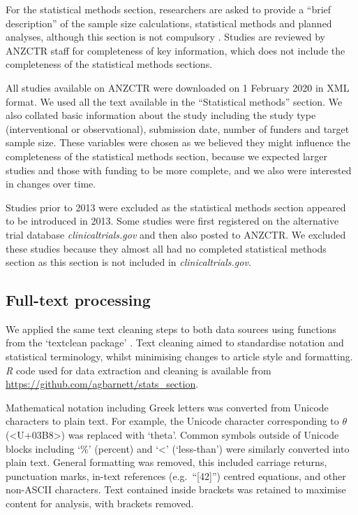 \documentclass[12pt]{article}
\begin{document}
For the statistical methods section, researchers are asked to provide a
``brief description'' of the sample size calculations, statistical
methods and planned analyses, although this section is not compulsory
\citep{ANZCTR}. Studies are reviewed by ANZCTR staff for completeness of
key information, which does not include the completeness of the
statistical methods sections.

All studies available on ANZCTR were downloaded on 1 February 2020 in
XML format. We used all the text available in the ``Statistical
methods'' section. We also collated basic information about the study
including the study type (interventional or observational), submission
date, number of funders and target sample size. These variables were
chosen as we believed they might influence the completeness of the
statistical methods section, because we expected larger studies and
those with funding to be more complete, and we also were interested in
changes over time.

Studies prior to 2013 were excluded as the statistical methods section
appeared to be introduced in 2013. Some studies were first registered on
the alternative trial database \emph{clinicaltrials.gov} and then also
posted to ANZCTR. We excluded these studies because they almost all had
no completed statistical methods section as this section is not included
in \emph{clinicaltrials.gov}.

\subsection{Full-text processing}
\label{sec:methods-cleaning}

We applied the same text cleaning steps to both data sources using
functions from the `textclean package' \citep{textclean}. Text cleaning
aimed to standardise notation and statistical terminology, whilst
minimising changes to article style and formatting. \emph{R} code used
for data extraction and cleaning is available from
\url{https://github.com/agbarnett/stats_section}.

Mathematical notation including Greek letters was converted from Unicode
characters to plain text. For example, the Unicode character
corresponding to \(\theta\) (\textless U+03B8\textgreater) was replaced
with `theta'. Common symbols outside of Unicode blocks including `\%'
(percent) and `\textless{}' (`less-than') were similarly converted into
plain text. General formatting was removed, this included carriage
returns, punctuation marks, in-text references (e.g.~``{[}42{]}'')
centred equations, and other non-ASCII characters. Text contained inside
brackets was retained to maximise content for analysis, with brackets
removed.
\end{document}
